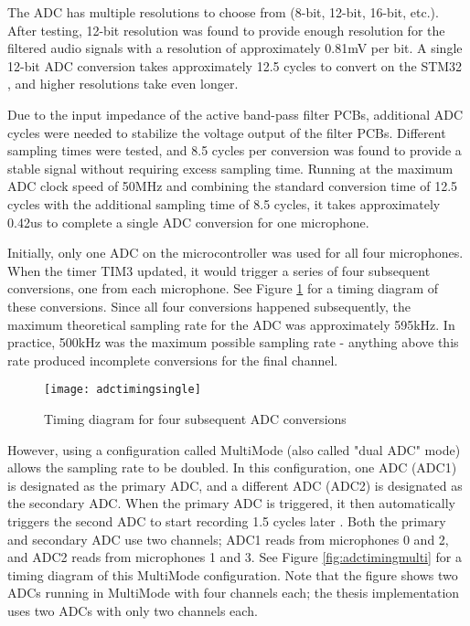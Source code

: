 \documentclass[12pt,a4paper]{report}
\begin{document}
The ADC has multiple resolutions to choose from (8-bit, 12-bit, 16-bit, etc.). After testing, 12-bit resolution was found to provide enough resolution for the filtered audio signals with a resolution of approximately 0.81mV per bit. A single 12-bit ADC conversion takes approximately 12.5 cycles to convert on the STM32 \cite{stmdatasheet}, and higher resolutions take even longer.

Due to the input impedance of the active band-pass filter PCBs, additional ADC cycles were needed to stabilize the voltage output of the filter PCBs. Different sampling times were tested, and 8.5 cycles per conversion was found to provide a stable signal without requiring excess sampling time. Running at the maximum ADC clock speed of 50MHz and combining the standard conversion time of 12.5 cycles with the additional sampling time of 8.5 cycles, it takes approximately 0.42us to complete a single ADC conversion for one microphone.

Initially, only one ADC on the microcontroller was used for all four microphones. When the timer TIM3 updated, it would trigger a series of four subsequent conversions, one from each microphone. See Figure \ref{fig:adctimingsingle} for a timing diagram of these conversions. Since all four conversions happened subsequently, the maximum theoretical sampling rate for the ADC was approximately 595kHz. In practice, 500kHz was the maximum possible sampling rate - anything above this rate produced incomplete conversions for the final channel.

\begin{figure}[htbp]
\centering
\texttt{[image: adctimingsingle]}
\caption{Timing diagram for four subsequent ADC conversions \cite{stmdatasheet}}
\label{fig:adctimingsingle}
\end{figure}

However, using a configuration called MultiMode (also called "dual ADC" mode) allows the sampling rate to be doubled. In this configuration, one ADC (ADC1) is designated as the primary ADC, and a different ADC (ADC2) is designated as the secondary ADC. When the primary ADC is triggered, it then automatically triggers the second ADC to start recording 1.5 cycles later \cite{stmdatasheet}. Both the primary and secondary ADC use two channels; ADC1 reads from microphones 0 and 2, and ADC2 reads from microphones 1 and 3. See Figure \ref{fig:adctimingmulti} for a timing diagram of this MultiMode configuration. Note that the figure shows two ADCs running in MultiMode with four channels each; the thesis implementation uses two ADCs with only two channels each.
\end{document}
